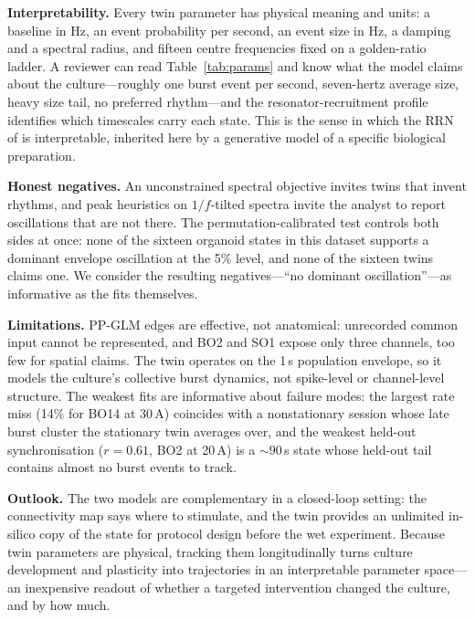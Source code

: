 \documentclass[fullpaper]{nldl}
\newcommand{\uA}{\,\textmu A}
\begin{document}
\textbf{Interpretability.} Every twin parameter has physical meaning and units: a baseline in Hz, an event probability per second, an event size in Hz, a damping and a spectral radius, and fifteen centre frequencies fixed on a golden-ratio ladder. A reviewer can read Table~\ref{tab:params} and know what the model claims about the culture---roughly one burst event per second, seven-hertz average size, heavy size tail, no preferred rhythm---and the resonator-recruitment profile identifies which timescales carry each state. This is the sense in which the RRN of \citet{kramer2025resonant} is interpretable, inherited here by a generative model of a specific biological preparation.

\textbf{Honest negatives.} An unconstrained spectral objective invites twins that invent rhythms, and peak heuristics on $1/f$-tilted spectra invite the analyst to report oscillations that are not there. The permutation-calibrated test controls both sides at once: none of the sixteen organoid states in this dataset supports a dominant envelope oscillation at the 5\% level, and none of the sixteen twins claims one. We consider the resulting negatives---``no dominant oscillation''---as informative as the fits themselves.

\textbf{Limitations.} PP-GLM edges are effective, not anatomical: unrecorded common input cannot be represented, and BO2 and SO1 expose only three channels, too few for spatial claims. The twin operates on the 1\,s population envelope, so it models the culture's collective burst dynamics, not spike-level or channel-level structure. The weakest fits are informative about failure modes: the largest rate miss (14\% for BO14 at 30\uA) coincides with a nonstationary session whose late burst cluster the stationary twin averages over, and the weakest held-out synchronisation ($r=0.61$, BO2 at 20\uA) is a ${\sim}90$\,s state whose held-out tail contains almost no burst events to track.

\textbf{Outlook.} The two models are complementary in a closed-loop setting: the connectivity map says where to stimulate, and the twin provides an unlimited in-silico copy of the state for protocol design before the wet experiment. Because twin parameters are physical, tracking them longitudinally turns culture development and plasticity into trajectories in an interpretable parameter space---an inexpensive readout of whether a targeted intervention changed the culture, and by how much.

\printbibliography
\end{document}
